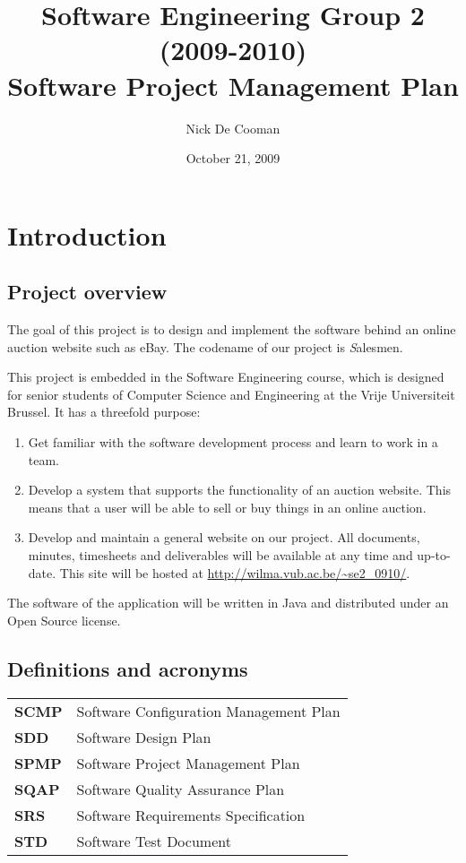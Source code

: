 \documentclass[a4paper, 12pt]{report}
\title{Software Engineering Group 2 (2009-2010) \\Software Project Management Plan}
\author{Nick De Cooman}
\date {October 21, 2009}
\begin{document}
	
	\maketitle
	
	\setcounter{tocdepth}{1}	
	\tableofcontents
	
	\chapter{Introduction}
	
		\section{Project overview}
		
			The goal of this project is to design and implement the software 
			behind an online auction website such as eBay. The codename of our project 
			is {\emph Salesmen}. 

			This project is embedded in the Software Engineering course, 
			which is designed for senior students of Computer Science and Engineering 
			at the Vrije Universiteit Brussel. It has a threefold purpose:
			
			\begin{enumerate}
				\item Get familiar with the software development process and learn to work
				in a team.
				
				\item Develop a system that supports the functionality of an auction website. 
				This means that a user will be able to sell or buy things in an online auction. 
				
				\item Develop and maintain a general website on our project. All documents,
				minutes, timesheets and deliverables will be available at
				any time and up-to-date. This site will be hosted at
				\url{http://wilma.vub.ac.be/~se2_0910/}.
			\end{enumerate}	
			
			The software of the application will be written in Java and 
			distributed under an Open Source license.
			
		\section{Definitions and acronyms}
		
			\begin{tabular}{l l}
				
				\textbf{SCMP} & Software Configuration Management Plan \\
				\textbf{SDD} & Software Design Plan \\
				\textbf{SPMP} & Software Project Management Plan \\
				\textbf{SQAP} & Software Quality Assurance Plan \\
				\textbf{SRS} & Software Requirements Specification \\
				\textbf{STD} & Software Test Document \\
				
			\end{tabular}	
		
\end{document}
